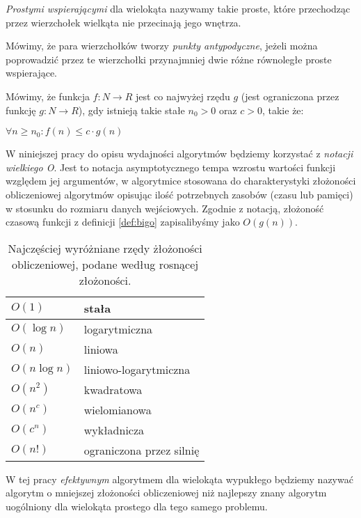 \begin{definicja}
  \emph{Prostymi wspierającymi} dla wielokąta nazywamy takie proste,
  które przechodząc przez wierzchołek wielkąta nie przecinają jego
  wnętrza.
\end{definicja}

\begin{definicja}
  Mówimy, że para wierzchołków tworzy \emph{punkty antypodyczne},
  jeżeli można poprowadzić przez te wierzchołki przynajmniej dwie
  różne równoległe proste wspierające.
\end{definicja}

\begin{definicja}\label{def:bigo}
  Mówimy, że funkcja $f\colon N \to R$ jest co najwyżej rzędu $g$
  (jest ograniczona przez funkcję $g\colon N \to R$), gdy istnieją
  takie stałe $n_0 > 0$ oraz $c > 0$, takie że:

  \begin{center}
    $\forall n \geq n_0 : f(n) \leq c \cdot g(n)$
  \end{center}
\end{definicja}

W niniejszej pracy do opisu wydajności algorytmów będziemy korzystać
z \emph{notacji wielkiego O}. Jest to notacja asymptotycznego tempa
wzrostu wartości funkcji względem jej argumentów, w algorytmice
stosowana do charakterystyki złożoności obliczeniowej algorytmów
opisując ilość potrzebnych zasobów (czasu lub pamięci) w stosunku
do rozmiaru danych wejściowych. Zgodnie z notacją, złożoność czasową
funkcji z definicji \ref{def:bigo} zapisalibyśmy jako $O(g(n))$.

\begin{table}[htb]
  \centering

  \begin{tabular}{ll}
    \toprule
    $O(1)$ & stała \\
    \midrule
    $O(\log n)$ & logarytmiczna \\
    \midrule
    $O(n)$ & liniowa \\
    \midrule
    $O(n \log n)$ & liniowo-logarytmiczna \\
    \midrule
    $O(n^2)$ & kwadratowa \\
    \midrule
    $O(n^c)$ & wielomianowa \\
    \midrule
    $O(c^n)$ & wykładnicza \\
    \midrule
    $O(n!)$ & ograniczona przez silnię \\
    \bottomrule
  \end{tabular}

  \caption{Najczęściej wyróżniane rzędy żłożoności obliczeniowej,
    podane według rosnącej złożoności.}
\end{table}

W tej pracy \emph{efektywnym} algorytmem dla wielokąta wypukłego będziemy
nazywać algorytm o mniejszej złożoności obliczeniowej niż najlepszy
znany algorytm uogólniony dla wielokąta prostego dla tego samego
problemu.

